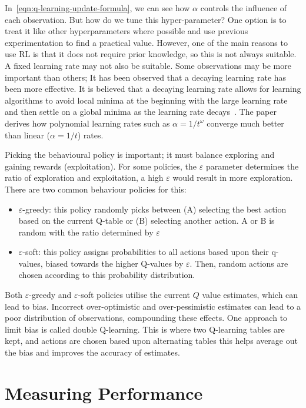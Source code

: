 \documentclass[]{final_report}
\begin{document}
In~\ref{eqn:q-learning-update-formula}, we can see how $\alpha$ controls the influence of each observation. But how do we tune this hyper-parameter? One option is to treat it like other hyperparameters where possible and use previous experimentation to find a practical value. However, one of the main reasons to use RL is that it does not require prior knowledge, so this is not always suitable. A fixed learning rate may not also be suitable. Some observations may be more important than others; It has been observed that a decaying learning rate has been more effective. It is believed that a decaying learning rate allows for learning algorithms to avoid local minima at the beginning with the large learning rate and then settle on a global minima as the learning rate decays~\cite{decayingLearningRates}. The paper ~\cite{even2003learning} derives how polynomial learning rates such as $\alpha = 1/t^\omega$ converge much better than linear ($\alpha = 1/t$) rates.

Picking the behavioural policy is important; it must balance exploring and gaining rewards (exploitation). For some policies, the $\varepsilon$ parameter determines the ratio of exploration and exploitation, a high $\varepsilon$ would result in more exploration. There are two common behaviour policies for this:
\begin{itemize}
  \item $\varepsilon$-greedy: this policy randomly picks between (A) selecting the best action based on the current Q-table or (B) selecting another action. A or B is random with the ratio determined by $\varepsilon$
  \item $\varepsilon$-soft: this policy assigns probabilities to all actions based upon their q-values, biased towards the higher Q-values by $\varepsilon$. Then, random actions are chosen according to this probability distribution.
\end{itemize}

Both $\varepsilon$-greedy and $\varepsilon$-soft policies utilise the current $Q$ value estimates, which can lead to bias. Incorrect over-optimistic and over-pessimistic estimates can lead to a poor distribution of observations, compounding these effects. One approach to limit bias is called double Q-learning. This is where two Q-learning tables are kept, and actions are chosen based upon alternating tables this helps average out the bias and improves the accuracy of estimates.


\section{Measuring Performance}\label{section:measuring-performance}
\end{document}
